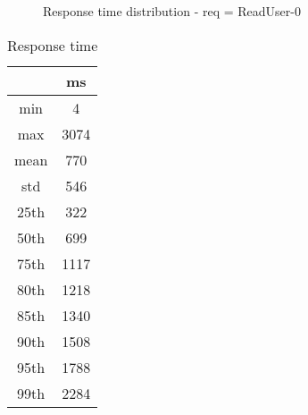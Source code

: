 \begin{minipage}{0.75\linewidth}
\begin{figure}[h]
\begin{adjustbox}{max width=1.0\linewidth, keepaspectratio}
  \end{adjustbox}
  \caption{Response time distribution - req = ReadUser-0}
\end{figure}
\end{minipage}\hfill\begin{minipage}{0.18\linewidth}
\begin{table}[h]
\begin{tabular}{|cc|}
\hline
\textbf{} & \textbf{ms}\\ \hline
 \Xhline{0.005\arrayrulewidth}
min & 4\\
 \Xhline{0.005\arrayrulewidth}
max & 3074\\
 \Xhline{0.005\arrayrulewidth}
mean & 770\\
 \Xhline{0.005\arrayrulewidth}
std & 546\\
\hline
\hline
 \Xhline{0.005\arrayrulewidth}
25th & 322\\
 \Xhline{0.005\arrayrulewidth}
50th & 699\\
 \Xhline{0.005\arrayrulewidth}
75th & 1117\\
 \Xhline{0.005\arrayrulewidth}
80th & 1218\\
 \Xhline{0.005\arrayrulewidth}
85th & 1340\\
 \Xhline{0.005\arrayrulewidth}
90th & 1508\\
 \Xhline{0.005\arrayrulewidth}
95th & 1788\\
 \Xhline{0.005\arrayrulewidth}
99th & 2284\\
\hline
\end{tabular}
\caption{Response time}
\end{table}
\end{minipage}\hfill